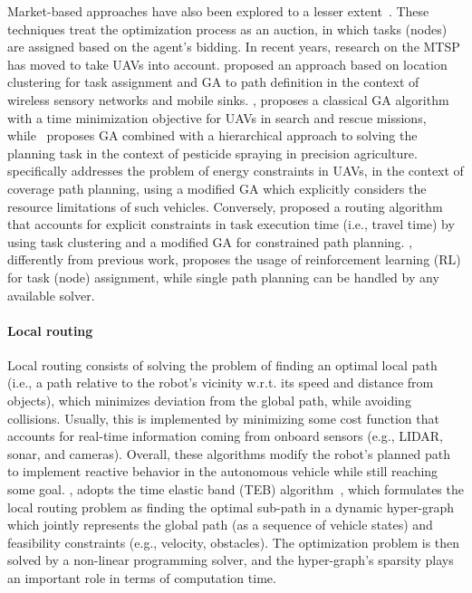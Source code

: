 Market-based approaches have also been explored to a lesser extent~\citep{kivelevitch2013market, elango2011balancing, koubaa2017move}. 
These techniques treat the optimization process as an auction, in which tasks (nodes) are assigned based on the agent's bidding. 
In recent years, research on the MTSP has moved to take UAVs into account.
\citet{wichmann2015smooth} proposed an approach based on location clustering for task assignment and GA to path definition in the context of wireless sensory networks and mobile sinks. 
\citet{hayat2017multi}, proposes a classical GA algorithm with a time minimization objective for UAVs in search and rescue missions, while~\citet{du2017precision} proposes GA combined with a hierarchical approach to solving the planning task in the context of pesticide spraying in precision agriculture.
\citet{chen2019multi} specifically addresses the problem of energy constraints in UAVs, in the context of coverage path planning, using a modified GA which explicitly considers the resource limitations of such vehicles. 
Conversely, \citet{ma2019coordinated} proposed a routing algorithm that accounts for explicit constraints in task execution time (i.e., travel time) by using task clustering and a modified GA for constrained path planning. 
\citet{hu2020reinforcement}, differently from previous work, proposes the usage of reinforcement learning (RL) for task (node) assignment, while single path planning can be handled by any available solver.  

\paragraph{Local routing}
Local routing consists of solving the problem of finding an optimal local path (i.e., a path relative to the robot's vicinity w.r.t. its speed and distance from objects), which minimizes deviation from the global path, while avoiding collisions. 
Usually, this is implemented by minimizing some cost function that accounts for real-time information coming from onboard sensors (e.g., LIDAR, sonar, and cameras).  
Overall, these algorithms modify the robot's planned path to implement reactive behavior in the autonomous vehicle while still reaching some goal.  
\citet{marin2018global}, adopts the time elastic band (TEB) algorithm~\citep{rosmann2013efficient}, which formulates the local routing problem as finding the optimal sub-path in a dynamic hyper-graph which jointly represents the global path (as a sequence of vehicle states) and feasibility constraints (e.g., velocity, obstacles). 
The optimization problem is then solved by a non-linear programming solver, and the hyper-graph's sparsity plays an important role in terms of computation time.  

